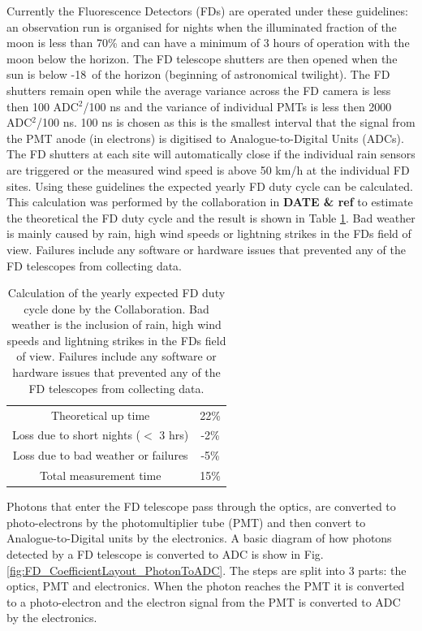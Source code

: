 Currently the Fluorescence Detectors (FDs) are operated under these guidelines: an observation run is organised for nights when the illuminated fraction of the moon is less than 70\% and can have a minimum of 3 hours of operation with the moon below the horizon. The FD telescope shutters are then opened when the sun is below -18\textdegree \ of the horizon (beginning of astronomical twilight). The FD shutters remain open while the average variance across the FD camera is less then 100 ADC$^2$/100 ns and the variance of individual PMTs is less then 2000 ADC$^2$/100 ns. 100 ns is chosen as this is the smallest interval that the signal from the PMT anode (in electrons) is digitised to Analogue-to-Digital Units (ADCs). The FD shutters at each site will automatically close if the individual rain sensors are triggered or the measured wind speed is above 50 km/h at the individual FD sites. Using these guidelines the expected yearly FD duty cycle can be calculated. This calculation was performed by the collaboration in \textbf{DATE \& ref} to estimate the theoretical the FD duty cycle and the result is shown in Table \ref{tab:FD_uptime}. Bad weather is mainly caused by rain, high wind speeds or lightning strikes in the FDs field of view. Failures include any software or hardware issues that prevented any of the FD telescopes from collecting data.

\begin{table}[h]
\centering
\begin{tabular}{ c c }
\hline\hline
Theoretical up time & 22\% \\
Loss due to short nights ($<$ 3 hrs) & -2\% \\
Loss due to bad weather or failures & -5\% \\ \hline \hline
Total measurement time & 15\% \\
\hline\hline
\end{tabular}
\caption{Calculation of the yearly expected FD duty cycle done by the Collaboration. Bad weather is the inclusion of rain, high wind speeds and lightning strikes in the FDs field of view. Failures include any software or hardware issues that prevented any of the FD telescopes from collecting data.} \label{tab:FD_uptime}
\end{table}


Photons that enter the FD telescope pass through the optics, are converted to photo-electrons by the photomultiplier tube (PMT) and then convert to Analogue-to-Digital units by the electronics. A basic diagram of how photons detected by a FD telescope is converted to ADC is show in Fig. \ref{fig:FD_CoefficientLayout_PhotonToADC}. The steps are split into 3 parts: the optics, PMT and electronics. When the photon reaches the PMT it is converted to a photo-electron and the electron signal from the PMT is converted to ADC by the electronics. 

